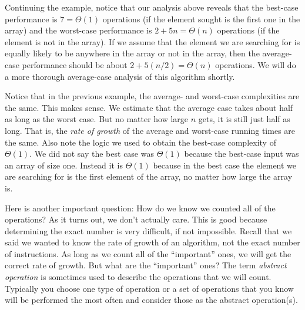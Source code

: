 \begin{exa}
Continuing the   example, notice that our analysis above reveals that the
best-case performance is $7=\Theta(1)$ operations 
(if the element sought is the first one in the array) and the worst-case performance is
$2+5n=\Theta(n)$ operations (if the element is not in the array).  
If we assume that the element we are searching for is
equally likely to be anywhere in the array or not in the array, 
then the average-case performance 
should be about $2+5(n/2)=\Theta(n)$ operations.  
We will do a more thorough average-case analysis of this algorithm shortly.
\end{exa}

Notice that in the previous example, 
the average- and worst-case complexities are the same.  This makes sense. 
We estimate that the average case takes about half as long as the worst case.  But no matter how
large $n$ gets, it is still just half as long.  
That is, the {\em rate of growth} of the average and worst-case running times are the same.
Also note the logic we used to obtain the best-case complexity of $\Theta(1)$.
We did not say the best case was $\Theta(1)$ because the best-case input was 
an array of size one.  Instead it is $\Theta(1)$ because in the best case the element we
are searching for is the first element of the array, no matter how large the array is.

Here is another important question: 
How do we know we counted all of the operations?
As it turns out, we don't actually care.
This is good because determining the exact number is very difficult, if not impossible. 
Recall that we said we wanted to know the rate of growth of an algorithm, not the exact number of instructions. 
As long as we count all of the ``important'' ones, we will get the correct rate of growth.  
But what are the ``important'' ones?
The term {\em abstract operation} is sometimes used to describe the operations that we will count.
Typically you choose one type of operation or a set of operations that you know will be performed 
the most often and consider those as the abstract operation(s).

